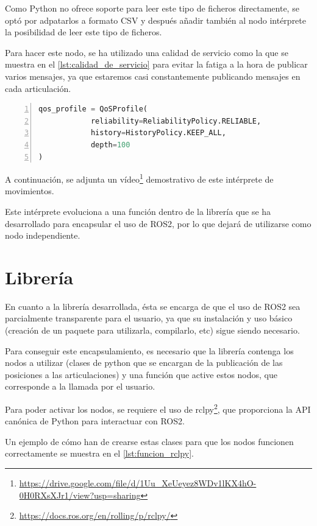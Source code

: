 Como Python no ofrece soporte para leer este tipo de ficheros directamente, se optó por adpatarlos a formato CSV y después añadir también al nodo intérprete la posibilidad de leer este tipo de ficheros.

Para hacer este nodo, se ha utilizado una calidad de servicio como la que se muestra en el \autoref{lst:calidad_de_servicio} para evitar la fatiga a la hora de publicar varios mensajes, ya que estaremos casi constantemente publicando mensajes en cada articulación.

\begin{lstlisting}[language=Python, caption={Calidad de servicio utilizada para publicación de mensajes}, label={lst:calidad_de_servicio}, numbers=left, backgroundcolor=\color{gray!10}]    
qos_profile = QoSProfile(
            reliability=ReliabilityPolicy.RELIABLE,
            history=HistoryPolicy.KEEP_ALL,
            depth=100
)
\end{lstlisting}
 
A continuación, se adjunta un vídeo\footnote{\url{https://drive.google.com/file/d/1Uu_XeUeyez8WDv1lKX4hO-0H0RXsXJr1/view?usp=sharing}} demostrativo de este intérprete de movimientos.

Este intérprete evoluciona a una función dentro de la librería que se ha desarrollado para encapsular el uso de ROS2, por lo que dejará de utilizarse como nodo independiente. 

\section{Librería} \label{sec:librería}

En cuanto a la librería desarrollada, ésta se encarga de que el uso de ROS2 sea parcialmente transparente para el usuario, ya que su instalación y uso básico (creación de un paquete para utilizarla, compilarlo, etc) sigue siendo necesario.

Para conseguir este encapsulamiento, es necesario que la librería contenga los nodos a utilizar (clases de python que se encargan de la publicación de las posiciones a las articulaciones) y una función que active estos nodos, que corresponde a la llamada por el usuario.

Para poder activar los nodos, se requiere el uso de rclpy\footnote{\url{https://docs.ros.org/en/rolling/p/rclpy/}}, que proporciona la API canónica de Python para interactuar con ROS2.

Un ejemplo de cómo han de crearse estas clases para que los nodos funcionen correctamente se muestra en el \autoref{lst:funcion_rclpy}.

